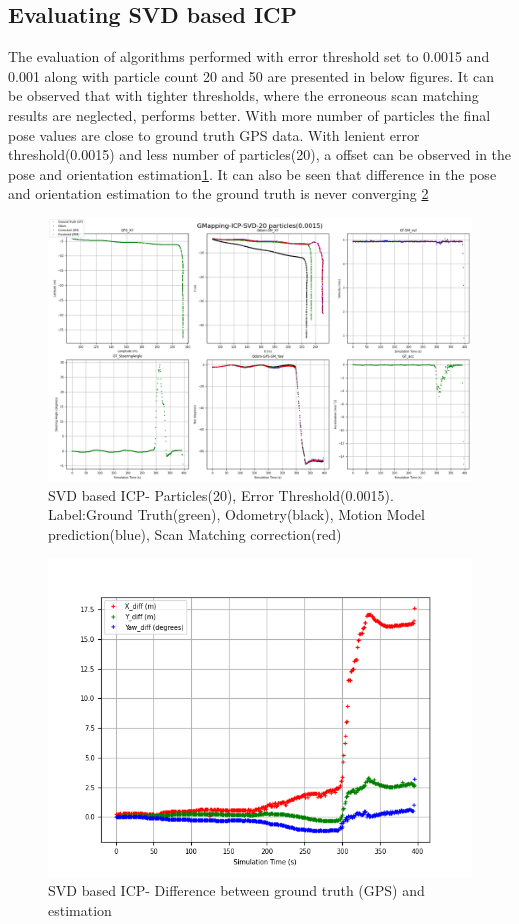 \subsection{Evaluating SVD based ICP}
The evaluation of algorithms performed with error threshold set to 0.0015 and  0.001 along with particle count 20 and 50 are presented in below figures. It can be observed that with tighter thresholds, where the erroneous scan matching results are neglected, performs better. With more number of particles the final pose values are close to ground truth GPS data.
With lenient error threshold(0.0015) and less number of particles(20), a offset can be observed in the pose and orientation estimation\ref{fig:SVD_20_0.0015}. It can also be seen that difference in the pose and orientation estimation to the ground truth is never converging \ref{fig:SVD_20_0.0015_diff}
    \begin{figure}[h] 
        \includegraphics[height=0.6\textwidth]{images/GMapping-ICP-SVD-20 particles(0.0015)_PositionParameters.png}
        \caption{SVD based ICP- Particles(20), Error Threshold(0.0015). Label:Ground Truth(green), Odometry(black), Motion Model prediction(blue), Scan Matching correction(red)}
        \label{fig:SVD_20_0.0015}
    \end{figure}
    \begin{figure}[h] 
        \includegraphics[height=0.4\textwidth]{images/GMapping-ICP-SVD-20 particles(0.0015)_True_vs_Crct.png}
        \caption{SVD based ICP- Difference between ground truth (GPS) and estimation}
        \label{fig:SVD_20_0.0015_diff}
    \end{figure}
